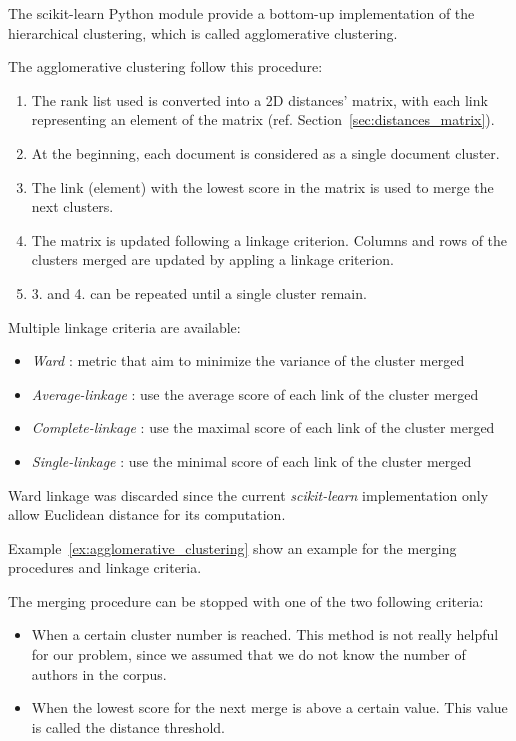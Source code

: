 The scikit-learn Python module \cite{sklearn} provide a bottom-up implementation of the hierarchical clustering, which is called agglomerative clustering.

The agglomerative clustering follow this procedure:
\begin{enumerate}
  \item The rank list used is converted into a 2D distances' matrix, with each link representing an element of the matrix (ref. Section~\ref{sec:distances_matrix}).
  \item At the beginning, each document is considered as a single document cluster.
  \item The link (element) with the lowest score in the matrix is used to merge the next clusters.
  \item The matrix is updated following a linkage criterion. Columns and rows of the clusters merged are updated by appling a linkage criterion.
  \item 3. and 4. can be repeated until a single cluster remain.
\end{enumerate}

Multiple linkage criteria are available:

\begin{itemize}
  \item
  \textit{Ward} : metric that aim to minimize the variance of the cluster merged
  \item
  \textit{Average-linkage} : use the average score of each link of the cluster merged
  \item
  \textit{Complete-linkage} : use the maximal score of each link of the cluster merged
  \item
  \textit{Single-linkage} : use the minimal score of each link of the cluster merged
\end{itemize}

Ward linkage was discarded since the current \textit{scikit-learn} implementation only allow Euclidean distance for its computation.

Example~\ref{ex:agglomerative_clustering} show an example for the merging procedures and linkage criteria.

The merging procedure can be stopped with one of the two following criteria:

\begin{itemize}
  \item
  When a certain cluster number is reached. This method is not really helpful for our problem, since we assumed that we do not know the number of authors in the corpus.
  \item
  When the lowest score for the next merge is above a certain value. This value is called the distance threshold.
\end{itemize}

